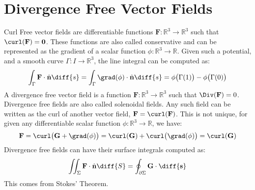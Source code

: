 \documentclass[crop=false,class=book,oneside]{standalone}                      %
\begin{document}
    \section{Divergence Free Vector Fields}
        Curl Free vector fields are differentiable functions
        $\mathbf{F}:\mathbb{R}^{3}\rightarrow\mathbb{R}^{3}$ such
        that $\curl(\mathbf{F})=\mathbf{0}$. These functions are
        also called conservative and can be represented as the
        gradient of a scalar function
        $\phi:\mathbb{R}^{3}\rightarrow\mathbb{R}$. Given such a
        potential, and a smooth curve
        $\Gamma:I\rightarrow\mathbb{R}^{3}$, the line integral
        can be computed as:
        \begin{equation}
            \int_{\Gamma}\mathbf{F}\cdot\hat{\mathbf{n}}\diff{s}
            =\int_{\Gamma}\grad(\phi)\cdot\hat{\mathbf{n}}\diff{s}
            =\phi\big(\Gamma(1)\big)-\phi\big(\Gamma(0)\big)
        \end{equation}
        A divergence free vector field is a function
        $\mathbf{F}:\mathbb{R}^{3}\rightarrow\mathbb{R}^{3}$ such
        that $\Div(\mathbf{F})=0$. Divergence free fields are also
        called solenoidal fields. Any such field can be written
        as the curl of another vector field,
        $\mathbf{F}=\curl(\mathbf{F})$. This is not unique, for given
        any differentiable scalar function
        $\phi:\mathbb{R}^{3}\rightarrow\mathbb{R}$, we have:
        \begin{equation}
            \mathbf{F}=\curl\big(\mathbf{G}+\grad(\phi)\big)
                =\curl(\mathbf{G})+\curl\big(\grad(\phi)\big)
                =\curl(\mathbf{G})
        \end{equation}
        Divergence free fields can have their surface integrals
        computed as:
        \begin{equation}
            \iint_{\Sigma}\mathbf{F}\cdot\hat{\mathbf{n}}\diff{S}=
            \oint_{\partial\Sigma}\mathbf{G}\cdot\mathbf{\diff{s}}
        \end{equation}
        This comes from Stokes' Theorem.
\end{document}
